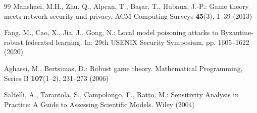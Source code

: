 \documentclass[12pt,a4paper]{article}
\newcommand{\rev}[1]{\textcolor{revcolor}{#1}}
\theoremstyle{definition}
\begin{document}
\begin{thebibliography}{99}
Manshaei, M.H., Zhu, Q., Alpcan, T., Başar, T., Hubaux, J.-P.: Game theory meets network security and privacy. ACM Computing Surveys \textbf{45}(3), 1--39 (2013)

Fang, M., Cao, X., Jia, J., Gong, N.: Local model poisoning attacks to Byzantine-robust federated learning. In: 29th USENIX Security Symposium, pp. 1605--1622 (2020)

\rev{Aghassi, M., Bertsimas, D.: Robust game theory. Mathematical Programming, Series B \textbf{107}(1--2), 231--273 (2006)}

\rev{Saltelli, A., Tarantola, S., Campolongo, F., Ratto, M.: Sensitivity Analysis in Practice: A Guide to Assessing Scientific Models. Wiley (2004)}

\end{thebibliography}
\end{document}
